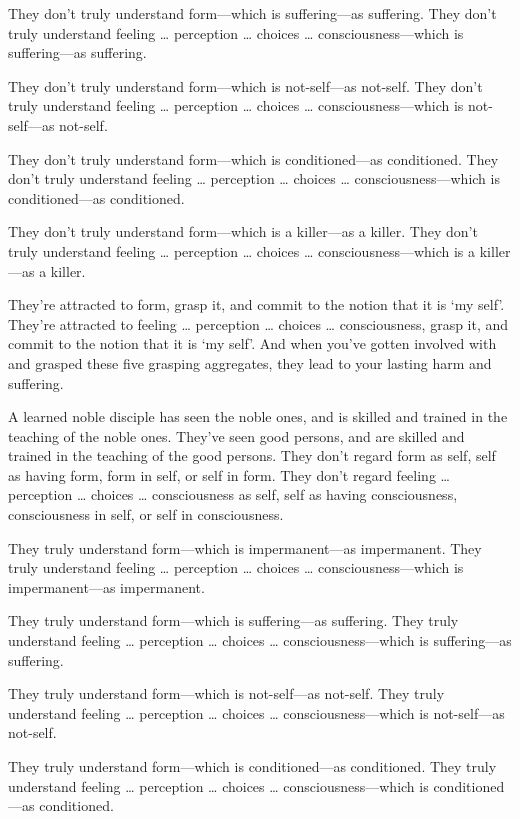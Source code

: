 \documentclass[12pt,openany]{book}%
\begin{document}
They don’t truly understand form—which is suffering—as suffering. They don’t truly understand feeling … perception … choices … consciousness—which is suffering—as suffering. 

They don’t truly understand form—which is not-self—as not-self. They don’t truly understand feeling … perception … choices … consciousness—which is not-self—as not-self. 

They don’t truly understand form—which is conditioned—as conditioned. They don’t truly understand feeling … perception … choices … consciousness—which is conditioned—as conditioned. 

They don’t truly understand form—which is a killer—as a killer. They don’t truly understand feeling … perception … choices … consciousness—which is a killer—as a killer. 

They’re attracted to form, grasp it, and commit to the notion that it is ‘my self’. They’re attracted to feeling … perception … choices … consciousness, grasp it, and commit to the notion that it is ‘my self’. And when you’ve gotten involved with and grasped these five grasping aggregates, they lead to your lasting harm and suffering. 

A learned noble disciple has seen the noble ones, and is skilled and trained in the teaching of the noble ones. They’ve seen good persons, and are skilled and trained in the teaching of the good persons. They don’t regard form as self, self as having form, form in self, or self in form. They don’t regard feeling … perception … choices … consciousness as self, self as having consciousness, consciousness in self, or self in consciousness. 

They truly understand form—which is impermanent—as impermanent. They truly understand feeling … perception … choices … consciousness—which is impermanent—as impermanent. 

They truly understand form—which is suffering—as suffering. They truly understand feeling … perception … choices … consciousness—which is suffering—as suffering. 

They truly understand form—which is not-self—as not-self. They truly understand feeling … perception … choices … consciousness—which is not-self—as not-self. 

They truly understand form—which is conditioned—as conditioned. They truly understand feeling … perception … choices … consciousness—which is conditioned—as conditioned. 
\end{document}

